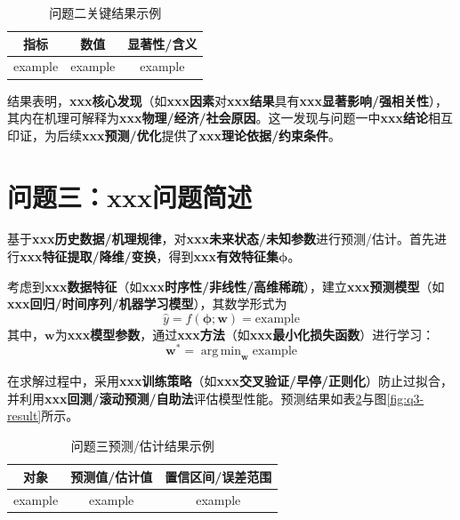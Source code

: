 \documentclass[draft,12pt,a4paper]{ctexart}
\theoremstyle{definition}
\DeclareMathOperator*{\argmin}{arg\,min}
\begin{document}
\begin{table}[H]\centering
  \caption{问题二关键结果示例}\label{tab:q2-result}
  \small
  \begin{tabular}{ccc}
    \toprule
    \textbf{指标} & \textbf{数值} & \textbf{显著性/含义} \\
    \midrule
    example & example & example \\
    \bottomrule
  \end{tabular}
\end{table}

结果表明，\textbf{xxx核心发现}（如\textbf{xxx因素}对\textbf{xxx结果}具有\textbf{xxx显著影响/强相关性}），其内在机理可解释为\textbf{xxx物理/经济/社会原因}。这一发现与问题一中\textbf{xxx结论}相互印证，为后续\textbf{xxx预测/优化}提供了\textbf{xxx理论依据/约束条件}。

\section{问题三：\textbf{xxx问题简述}}

基于\textbf{xxx历史数据/机理规律}，对\textbf{xxx未来状态/未知参数}进行预测/估计。首先进行\textbf{xxx特征提取/降维/变换}，得到\textbf{xxx有效特征集}$\boldsymbol{\phi}$。

考虑到\textbf{xxx数据特征}（如\textbf{xxx时序性/非线性/高维稀疏}），建立\textbf{xxx预测模型}（如\textbf{xxx回归/时间序列/机器学习模型}），其数学形式为
\begin{equation}\label{eq:q3-model}
  \hat{y} = f(\boldsymbol{\phi}; \boldsymbol{w}) = \text{example}
\end{equation}
其中，$\boldsymbol{w}$为\textbf{xxx模型参数}，通过\textbf{xxx方法}（如\textbf{xxx最小化损失函数}）进行学习：
\begin{equation}\label{eq:q3-train}
  \boldsymbol{w}^* = \argmin_{\boldsymbol{w}} \text{example}
\end{equation}

在求解过程中，采用\textbf{xxx训练策略}（如\textbf{xxx交叉验证/早停/正则化}）防止过拟合，并利用\textbf{xxx回测/滚动预测/自助法}评估模型性能。预测结果如表\ref{tab:q3-result}与图\ref{fig:q3-result}所示。

\begin{table}[H]\centering
  \caption{问题三预测/估计结果示例}\label{tab:q3-result}
  \small
  \begin{tabular}{ccc}
    \toprule
    \textbf{对象} & \textbf{预测值/估计值} & \textbf{置信区间/误差范围} \\
    \midrule
    example & example & example \\
    \bottomrule
  \end{tabular}
\end{table}
\end{document}
